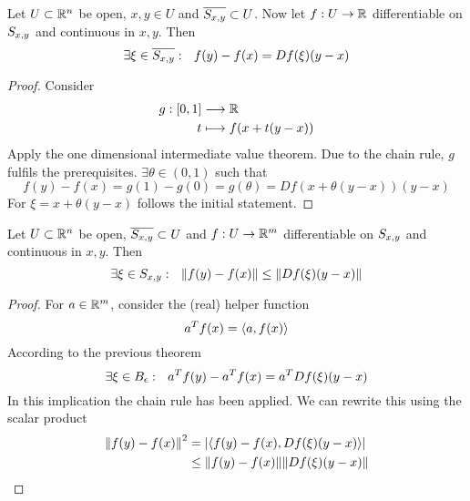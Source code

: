 \documentclass[../../script.tex]{subfiles}
\begin{document}
\begin{thm}
    Let $U \subset \mathbb{R}^n$ be open, $x, y \in U$ and $\overline{S_{{x,y}}} \subset U$.
    Now let $f: U \rightarrow \mathbb{R}$ differentiable on $S_{{x,y}}$ and continuous in $x, y$. Then 
    \[
        \exists \xi \in \overline{S_{{x,y}}}: ~~f(y) - f(x) = Df(\xi) (y-x)
    \]
\end{thm}
\begin{proof}
    Consider 
    \begin{equation}
    \begin{split}
        g: [0, 1] &\longrightarrow \mathbb{R} \\
        t &\longmapsto f(x + t(y - x))
    \end{split}
    \end{equation}
    Apply the one dimensional intermediate value theorem. Due to the chain rule, $g$ fulfils the prerequisites.
    $\exists \theta \in (0, 1)$ such that
    \begin{equation}
        f(y) - f(x) = g(1) - g(0) = g(\theta) = Df(x + \theta(y - x))(y - x)
    \end{equation}
    For $\xi = x + \theta(y - x)$ follows the initial statement.
\end{proof}

\begin{thm}
    Let $U \subset \mathbb{R}^n$ be open, $\overline{S_{{x,y}}} \subset U$ and $f: U \rightarrow \mathbb{R}^m$ differentiable on $S_{{x,y}}$ and continuous in $x, y$. Then 
    \[
        \exists \xi \in S_{{x,y}}: ~~\norm{f(y) - f(x)} \le \norm{Df(\xi)(y - x)}
    \]
\end{thm}
\begin{proof}
    For $a \in \mathbb{R}^m$, consider the (real) helper function 
    \begin{equation}
        a^Tf(x) = \langle a,f(x)\rangle
    \end{equation}
    According to the previous theorem
    \begin{equation}
        \exists \xi \in B_{\epsilon}: ~~a^T f(y) - a^T f(x) = a^T D f(\xi)(y - x)
    \end{equation}
    In this implication the chain rule has been applied. We can rewrite this using the scalar product
    \begin{equation}
        \begin{split}
            \norm{f(y) - f(x)}^2 &= \abs{\langle f(y) - f(x),Df(\xi)(y-x)\rangle} \\
            &\le \norm{f(y) - f(x)}\norm{Df(\xi)(y - x)}
        \end{split}
    \end{equation}
\end{proof}
\end{document}
